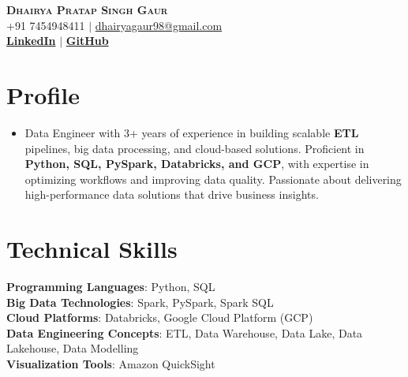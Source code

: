 \documentclass[letterpaper,11pt]{article}
\begin{document}
\begin{center}
    \textbf{\Huge \scshape Dhairya Pratap Singh Gaur} \\ \vspace{1pt}
    \small +91 7454948411 $|$ \href{mailto:dhairyagaur98@gmail.com}{{dhairyagaur98@gmail.com}}    \\ 
    \small  
    \href{https://www.linkedin.com/in/asmogaur/}{\bf LinkedIn} $|$
    \href{https://github.com/Asmogaur}{\bf GitHub} 
    
\end{center}

\section{Profile}
\begin{itemize}[leftmargin=0.15in, label={}]
\item 
Data Engineer with 3+ years of experience in building scalable \textbf{ETL} pipelines, big data processing, and cloud-based solutions. Proficient in \textbf{Python, SQL, PySpark, Databricks, and GCP}, with expertise in optimizing workflows and improving data quality. Passionate about delivering high-performance data solutions that drive business insights.
\end{itemize}

\section{Technical Skills}
 \begin{itemize}[leftmargin=0.15in, label={}]
    \small{\item{
     \textbf{Programming Languages}{:\hspace{0.76cm} Python, SQL} \\
     \textbf{Big Data Technologies}{:\hspace{1.19cm} Spark, PySpark, Spark SQL} \\
     \textbf{Cloud Platforms}{:\hspace{2.21cm} Databricks, Google Cloud Platform (GCP)} \\
     \textbf{Data Engineering Concepts}{:\hspace{0.30cm} ETL, Data Warehouse, Data Lake, Data Lakehouse, Data Modelling} \\
     \textbf{Visualization Tools}{:\hspace{1.79cm} Amazon QuickSight} \\
    }}
 \end{itemize}
\end{document}
